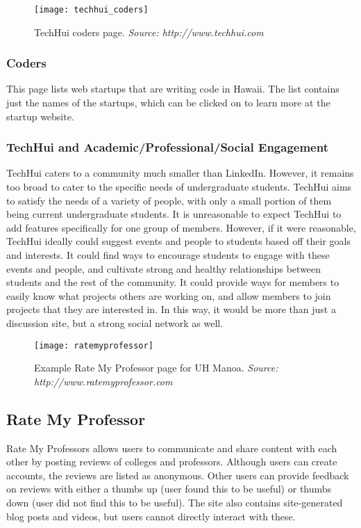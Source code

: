 \begin{figure}[h]
\centering
\texttt{[image: techhui\_coders]}
\caption{TechHui coders page. \textit{Source: http://www.techhui.com}}
\end{figure}
\subsubsection{Coders}
This page lists web startups that are writing code in Hawaii. The list contains just the names of the startups, which can be clicked on to learn more at the startup website.

\subsubsection{TechHui and Academic/Professional/Social Engagement}
TechHui caters to a community much smaller than LinkedIn. However, it remains too broad to cater to the specific needs of undergraduate students. TechHui aims to satisfy the needs of a variety of people, with only a small portion of them being current undergraduate students. It is unreasonable to expect TechHui to add features specifically for one group of members. However, if it were reasonable, TechHui ideally could suggest events and people to students based off their goals and interests. It could find ways to encourage students to engage with these events and people, and cultivate strong and healthy relationships between students and the rest of the community. It could provide ways for members to easily know what projects others are working on, and allow members to join projects that they are interested in. In this way, it would be more than just a discussion site, but a strong social network as well. 

\begin{figure}[h]
\centering
\texttt{[image: ratemyprofessor]}
\caption{Example Rate My Professor page for UH Manoa. \textit{Source: http://www.ratemyprofessor.com}}
\end{figure}
\subsection{Rate My Professor}
Rate My Professors allows users to communicate and share content with each other by posting reviews of colleges and professors. Although users can create accounts, the reviews are listed as anonymous. Other users can provide feedback on reviews with either a thumbs up (user found this to be useful) or thumbs down (user did not find this to be useful). The site also contains site-generated blog posts and videos, but users cannot directly interact with these.


